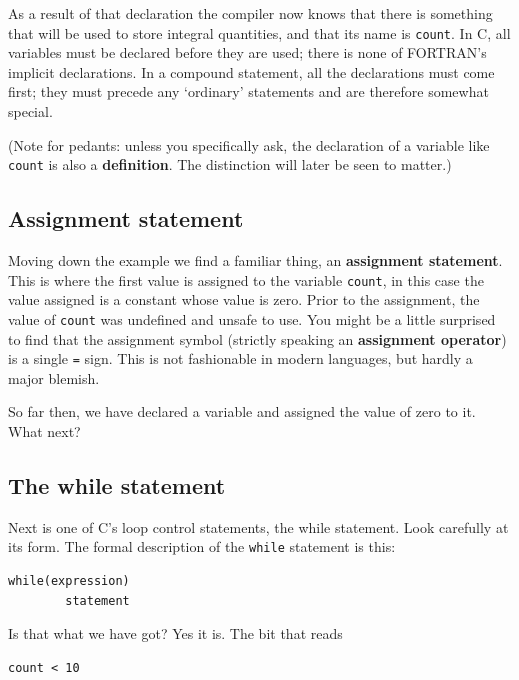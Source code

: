    As a result of that declaration the compiler now knows that there is
    something that will be used to store integral quantities, and that its name
    is \texttt{count}. In C, all variables must be declared before they are
    used; there is none of FORTRAN's implicit declarations. In a compound
    statement, all the declarations must come first; they must precede any
    `ordinary' statements and are therefore somewhat special.


   (Note for pedants: unless you specifically ask, the declaration of a
    variable like \texttt{count} is also a \textbf{definition}. The
    distinction will later be seen to matter.)


  

  \subsection{Assignment statement}
   

   Moving down the example we find a familiar thing, an \textbf{assignment
     statement}. This is where the first value is assigned to the variable
     \texttt{count}, in this case the value assigned is a constant whose
     value is zero. Prior to the assignment, the value of \texttt{count}
     was undefined and unsafe to use. You might be a little surprised to find
     that the assignment symbol (strictly speaking an \textbf{assignment
     operator}) is a single \texttt{=} sign. This is not fashionable
     in modern languages, but hardly a major blemish.


   So far then, we have declared a variable and assigned the value of zero
    to it. What next?


  

  \subsection{The while statement}
   

   Next is one of C's loop control statements, the while statement. Look
    carefully at its form. The formal description of the \texttt{while}
    statement is this:


   \begin{Verbatim}
while(expression)
        statement
\end{Verbatim}

   Is that what we have got? Yes it is. The bit that reads


   \begin{Verbatim}
count < 10
\end{Verbatim}

